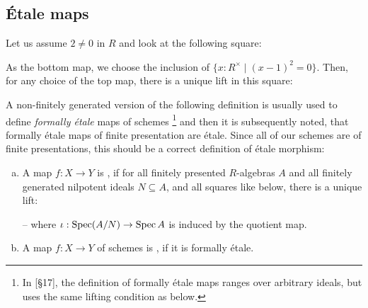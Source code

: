 \subsection{\'Etale maps}

\begin{example}
  Let us assume $2\neq 0$ in $R$ and look at the following square:
  \begin{center}
  \end{center}
  As the bottom map, we choose the inclusion of $\{x:R^\times \mid (x-1)^2=0 \}$.
  Then, for any choice of the top map, there is a unique lift in this square:
  \begin{center}
  \end{center}
\end{example}

A non-finitely generated version of the following definition is usually used
to define \emph{formally étale} maps of schemes
\footnote{In \cite{EGAIV3}[§17], the definition of formally étale maps ranges over arbitrary ideals, but uses the same lifting condition as below.}
and then it is subsequently noted,
that formally étale maps of finite presentation are étale.
Since all of our schemes are of finite presentations, this should be a correct definition of étale morphism:

\begin{definition}
  \begin{enumerate}[(a)]
  \item   A map $f:X\to Y$ is ,
    if for all finitely presented $R$-algebras $A$ and all finitely generated nilpotent ideals $N\subseteq A$,
    and all squares like below, there is a unique lift:
    \begin{center}
    \end{center}
    -- where $\iota:\operatorname{Spec} (A/N)\to \operatorname{Spec} A$ is induced by the quotient map.
  \item A map $f:X\to Y$ of schemes is , if it is formally étale.
  \end{enumerate}
\end{definition}

